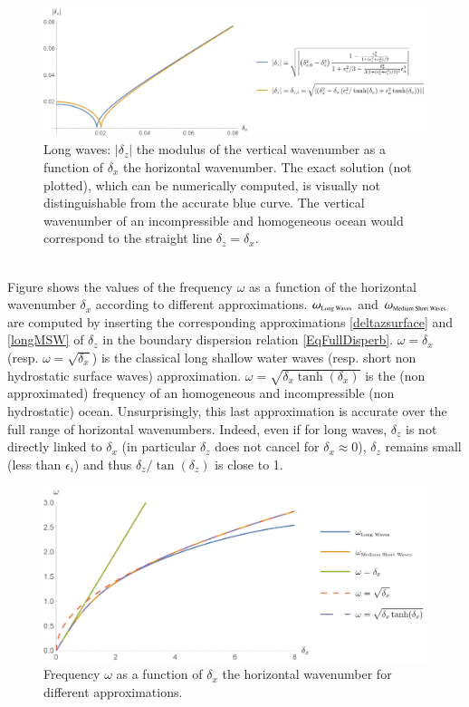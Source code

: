 \begin{figure}[h]
	\centerline{
		\includegraphics[width=0.9\linewidth]{FIGURES/dzdx.png}
	}
	\caption{Long waves: $|\delta_z|$ the modulus of the vertical wavenumber as a function of $\delta_x$ the horizontal wavenumber. The exact solution (not plotted), which can be numerically computed, is visually not distinguishable from the accurate blue curve. The vertical wavenumber of an incompressible and homogeneous ocean would correspond to the straight line $\delta_z=\delta_x$.}
	\label{dzdx}
\end{figure}
\\
%
%
Figure  shows the values of the frequency $\omega$ as a function of the horizontal wavenumber $\delta_x$ according to different approximations. $\omega_{\mbox{\tiny Long Waves}}$ and $\omega_{\mbox{\tiny Medium Short Waves}}$ are computed by inserting the corresponding approximations \ref{deltazsurface} and \ref{longMSW} of $\delta_z$ in the boundary dispersion relation \ref{EqFullDisperb}. $\omega=\delta_x$ (resp. $\omega=\sqrt{\delta_x}$) is the classical long shallow water waves (resp. short non hydrostatic surface waves) approximation. $\omega=\sqrt{\delta_x \tanh(\delta_x)}$ is the (non approximated) frequency of an homogeneous and incompressible (non hydrostatic) ocean. Unsurprisingly, this last approximation is accurate over the full range of horizontal wavenumbers. Indeed, even if for long waves, $\delta_z$ is not directly linked to $\delta_x$ (in particular $\delta_z$ does not cancel for $\delta_x \approx 0$), $\delta_z$ remains small (less than $\epsilon_i$) and thus $\delta_z/\tan(\delta_z)$ is close to 1.
\begin{figure}[h]
	\centerline{
		\includegraphics[width=0.9\linewidth]{FIGURES/omegadx.png}
	}
	\caption{Frequency $\omega$ as a function of $\delta_x$ the horizontal wavenumber for different approximations.}
	\label{omegadx}
\end{figure}



